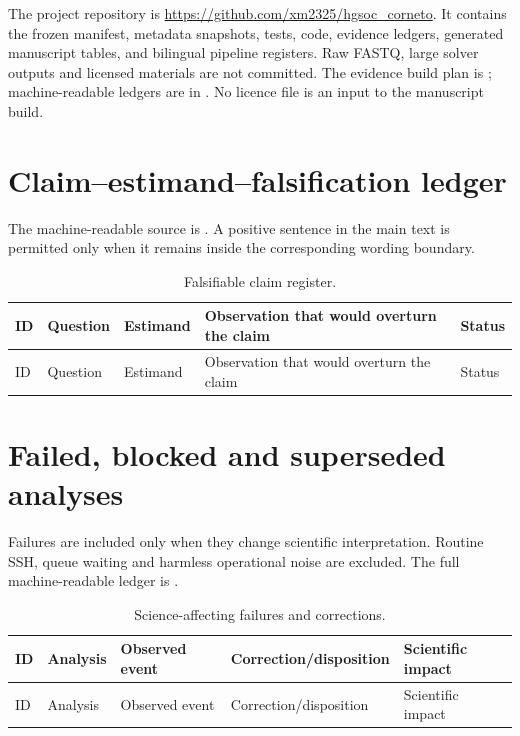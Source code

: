 \documentclass[10pt]{article}
\begin{document}
The project repository is
\url{https://github.com/xm2325/hgsoc_corneto}.  It contains the frozen manifest,
metadata snapshots, tests, code, evidence ledgers, generated manuscript tables,
and bilingual pipeline registers.  Raw FASTQ, large solver outputs and licensed
materials are not committed.  The evidence build plan is
; machine-readable ledgers are in
.  No licence file is an input to the manuscript build.

\appendix

\section{Claim--estimand--falsification ledger}
\label{app:claims}

The machine-readable source is .  A positive sentence
in the main text is permitted only when it remains inside the corresponding
wording boundary.

\scriptsize
\begin{longtable}{p{0.7cm}p{3.1cm}p{3.2cm}p{4.1cm}p{2.2cm}}
\caption{Falsifiable claim register.}\label{tab:claims}\\
\toprule
ID & Question & Estimand & Observation that would overturn the claim & Status \\
\midrule
\endfirsthead
\toprule
ID & Question & Estimand & Observation that would overturn the claim & Status \\
\midrule
\endhead

\bottomrule
\end{longtable}
\normalsize

\section{Failed, blocked and superseded analyses}
\label{app:failures}

Failures are included only when they change scientific interpretation.  Routine
SSH, queue waiting and harmless operational noise are excluded.  The full
machine-readable ledger is .

\scriptsize
\begin{longtable}{p{0.7cm}p{2.2cm}p{3.2cm}p{3.4cm}p{3.5cm}}
\caption{Science-affecting failures and corrections.}\label{tab:failures}\\
\toprule
ID & Analysis & Observed event & Correction/disposition & Scientific impact \\
\midrule
\endfirsthead
\toprule
ID & Analysis & Observed event & Correction/disposition & Scientific impact \\
\midrule
\endhead

\bottomrule
\end{longtable}
\normalsize
\end{document}
